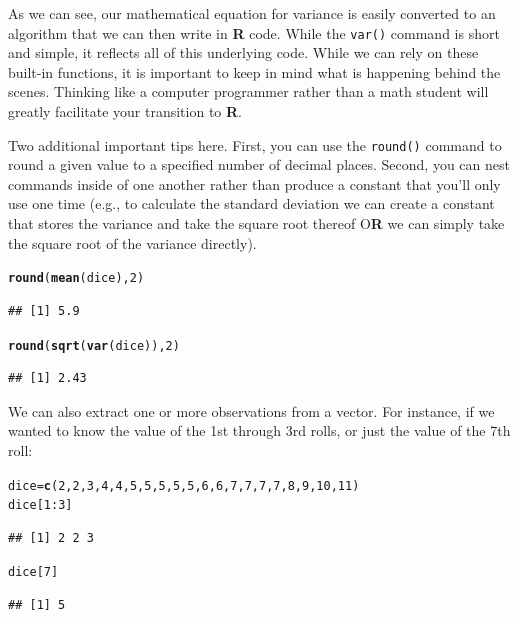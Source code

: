 \documentclass[12pt]{article}\usepackage[]{graphicx}\usepackage[]{color}
\makeatletter
\newcommand{\hlnum}[1]{\textcolor[rgb]{0.686,0.059,0.569}{#1}}%
\newcommand{\hlopt}[1]{\textcolor[rgb]{0,0,0}{#1}}%
\newcommand{\hlstd}[1]{\textcolor[rgb]{0.345,0.345,0.345}{#1}}%
\newcommand{\hlkwb}[1]{\textcolor[rgb]{0.69,0.353,0.396}{#1}}%
\newcommand{\hlkwd}[1]{\textcolor[rgb]{0.737,0.353,0.396}{\textbf{#1}}}%
\newenvironment{kframe}{%
 \def\at@end@of@kframe{}%
 \ifinner\ifhmode%
  \def\at@end@of@kframe{\end{minipage}}%
  \begin{minipage}{\columnwidth}%
 \fi\fi%
 \def\FrameCommand##1{\hskip\@totalleftmargin \hskip-\fboxsep
 \colorbox{shadecolor}{##1}\hskip-\fboxsep
     \hskip-\linewidth \hskip-\@totalleftmargin \hskip\columnwidth}%
 \MakeFramed {\advance\hsize-\width
   \@totalleftmargin\z@ \linewidth\hsize
   \@setminipage}}%
 {\par\unskip\endMakeFramed%
 \at@end@of@kframe}
\newenvironment{knitrout}{}{} %
\makeatother
\begin{document}
As we can see, our mathematical equation for variance is easily converted to an algorithm that we can then write in \textbf{R} code. While the \verb|var()| command is short and simple, it reflects all of this underlying code. While we can rely on these built-in functions, it is important to keep in mind what is happening behind the scenes. Thinking like a computer programmer rather than a math student will greatly facilitate your transition to \textbf{R}.

Two additional important tips here. First, you can use the \verb|round()| command to round a given value to a specified number of decimal places. Second, you can nest commands inside of one another rather than produce a constant that you'll only use one time (e.g., to calculate the standard deviation we can create a constant that stores the variance and take the square root thereof O\textbf{R} we can simply take the square root of the variance directly).
\begin{knitrout}
\color{fgcolor}\begin{kframe}
\begin{alltt}
\hlkwd{round}\hlstd{(}\hlkwd{mean}\hlstd{(dice),} \hlnum{2}\hlstd{)}
\end{alltt}
\begin{verbatim}
## [1] 5.9
\end{verbatim}
\begin{alltt}
\hlkwd{round}\hlstd{(}\hlkwd{sqrt}\hlstd{(}\hlkwd{var}\hlstd{(dice)),} \hlnum{2}\hlstd{)}
\end{alltt}
\begin{verbatim}
## [1] 2.43
\end{verbatim}
\end{kframe}
\end{knitrout}


We can also extract one or more observations from a vector. For instance, if we wanted to know the value of the 1st through 3rd rolls, or just the value of the 7th roll:
\begin{knitrout}
\color{fgcolor}\begin{kframe}
\begin{alltt}
\hlstd{dice} \hlkwb{=} \hlkwd{c}\hlstd{(}\hlnum{2}\hlstd{,} \hlnum{2}\hlstd{,} \hlnum{3}\hlstd{,} \hlnum{4}\hlstd{,} \hlnum{4}\hlstd{,} \hlnum{5}\hlstd{,} \hlnum{5}\hlstd{,} \hlnum{5}\hlstd{,} \hlnum{5}\hlstd{,} \hlnum{5}\hlstd{,} \hlnum{6}\hlstd{,} \hlnum{6}\hlstd{,} \hlnum{7}\hlstd{,} \hlnum{7}\hlstd{,} \hlnum{7}\hlstd{,} \hlnum{7}\hlstd{,} \hlnum{8}\hlstd{,} \hlnum{9}\hlstd{,} \hlnum{10}\hlstd{,} \hlnum{11}\hlstd{)}
\hlstd{dice[}\hlnum{1}\hlopt{:}\hlnum{3}\hlstd{]}
\end{alltt}
\begin{verbatim}
## [1] 2 2 3
\end{verbatim}
\begin{alltt}
\hlstd{dice[}\hlnum{7}\hlstd{]}
\end{alltt}
\begin{verbatim}
## [1] 5
\end{verbatim}
\end{kframe}
\end{knitrout}
\end{document}
